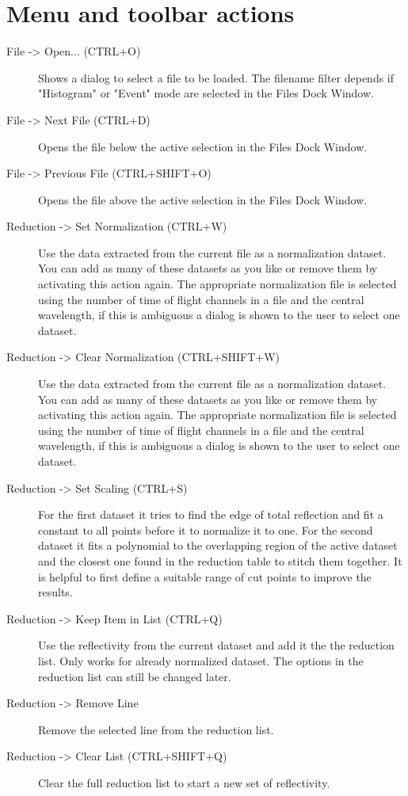 \section{Menu and toolbar actions}
  
  \begin{description}
   \item[{ File -> Open... (CTRL+O)}] Shows a dialog to select a file to be loaded. The filename filter depends if "Histogram" or "Event" mode are selected in the Files Dock Window.
   \item[{ File -> Next File (CTRL+D)}] Opens the file below the active selection in the Files Dock Window.
   \item[{ File -> Previous File (CTRL+SHIFT+O)}] Opens the file above the active selection in the Files Dock Window.
   
   \item[{ Reduction -> Set Normalization (CTRL+W)}] Use the data extracted from the current file as a normalization dataset. You can add as many of these datasets as you like or remove them by activating this action again. The appropriate normalization file is selected using the number of time of flight channels in a file and the central wavelength, if this is ambiguous a dialog is shown to the user to select one dataset.
   \item[{ Reduction -> Clear Normalization (CTRL+SHIFT+W)}] Use the data extracted from the current file as a normalization dataset. You can add as many of these datasets as you like or remove them by activating this action again. The appropriate normalization file is selected using the number of time of flight channels in a file and the central wavelength, if this is ambiguous a dialog is shown to the user to select one dataset.
   
   \item[{ Reduction -> Set Scaling (CTRL+S)}] For the first dataset it tries to find the edge of total reflection and fit a constant to all points before it to normalize it to one. For the second dataset it fits a polynomial to the overlapping region of the active dataset and the closest one found in the reduction table to stitch them together. It is helpful to first define a suitable range of cut points to improve the results.
   \item[{ Reduction -> Keep Item in List (CTRL+Q)}] Use the reflectivity from the current dataset and add it the the reduction list. Only works for already normalized dataset. The options in the reduction list can still be changed later.
   \item[{ Reduction -> Remove Line}] Remove the selected line from the reduction list.
   \item[{ Reduction -> Clear List (CTRL+SHIFT+Q)}] Clear the full reduction list to start a new set of reflectivity.


\end{description}
